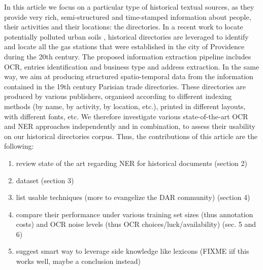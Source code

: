 In this article we focus on a particular type of historical textual sources, as they provide very rich, semi-structured and time-stamped information about people, their activities and their locations: the directories. In a recent work to locate potentially polluted urban soils \cite{bell2020automated}, historical directories are leveraged to identify and locate all the gas stations that were established in the city of Providence during the 20th century. The proposed information extraction pipeline includes OCR, entries identification and business type and address extraction. In the same way, we aim at producing structured spatio-temporal data from the information contained in the 19th century Parisian trade directories. These directories are produced by various publishers, organised according to different indexing methods (by name, by activity, by location, etc.), printed in different layouts, with different fonts, etc. We therefore investigate various state-of-the-art OCR and NER approaches independently and in combination, to assess their usability on our historical directories corpus. Thus, the contributions of this article are the following:
\begin{enumerate}
    \item review state of the art regarding NER for historical documents (section 2)
    \item dataset (section 3)
    \item list usable techniques (more to evangelize the DAR community) (section 4)
    \item compare their performance under various training set sizes (thus annotation costs) and OCR noise levels (thus OCR choices/luck/availability) (sec. 5 and 6)
    \item suggest smart way to leverage side knowledge like lexicons (FIXME iif this works well, maybe a conclusion instead)
\end{enumerate}


